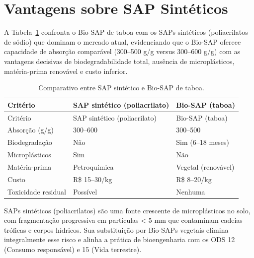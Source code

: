 \documentclass[
  portuguese,
  11pt,
  a4paper,
  open=any]{scrbook}
\begin{document}
\section{Vantagens sobre SAP
Sintéticos}\label{vantagens-sobre-sap-sintuxe9ticos}

A Tabela~\ref{tbl-comparativo-sap} confronta o Bio-SAP de taboa com os
SAPs sintéticos (poliacrilatos de sódio) que dominam o mercado atual,
evidenciando que o Bio-SAP oferece capacidade de absorção comparável
(300--500 g/g versus 300--600 g/g) com as vantagens decisivas de
biodegradabilidade total, ausência de microplásticos, matéria-prima
renovável e custo inferior.

\begin{longtable}[]{@{}lll@{}}
\caption{Comparativo entre SAP sintético e Bio-SAP de
taboa.}\label{tbl-comparativo-sap}\tabularnewline
\toprule\noalign{}
Critério & SAP sintético (poliacrilato) & Bio-SAP (taboa) \\
\midrule\noalign{}
\endfirsthead
\toprule\noalign{}
Critério & SAP sintético (poliacrilato) & Bio-SAP (taboa) \\
\midrule\noalign{}
\endhead
\bottomrule\noalign{}
\endlastfoot
Absorção (g/g) & 300--600 & 300--500 \\
Biodegradação & Não & Sim (6--18 meses) \\
Microplásticos & Sim & Não \\
Matéria-prima & Petroquímica & Vegetal (renovável) \\
Custo & R\$ 15--30/kg & R\$ 8--20/kg \\
Toxicidade residual & Possível & Nenhuma \\
\end{longtable}

\begin{tcolorbox}[enhanced jigsaw, leftrule=.75mm, colframe=quarto-callout-important-color-frame, colback=white, bottomrule=.15mm, opacityback=0, colbacktitle=quarto-callout-important-color!10!white, breakable, bottomtitle=1mm, opacitybacktitle=0.6, title=\textcolor{quarto-callout-important-color}{\faExclamation}\hspace{0.5em}{Relevância ambiental}, titlerule=0mm, toprule=.15mm, toptitle=1mm, rightrule=.15mm, left=2mm, arc=.35mm, coltitle=black]

SAPs sintéticos (poliacrilatos) são uma fonte crescente de
microplásticos no solo, com fragmentação progressiva em partículas
\textless{} 5 mm que contaminam cadeias tróficas e corpos hídricos. Sua
substituição por Bio-SAPs vegetais elimina integralmente esse risco e
alinha a prática de bioengenharia com os ODS 12 (Consumo responsável) e
15 (Vida terrestre).

\end{tcolorbox}
\end{document}
